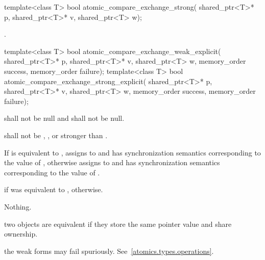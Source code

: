 %
%
\begin{itemdecl}
template<class T>
  bool atomic_compare_exchange_strong(
    shared_ptr<T>* p, shared_ptr<T>* v, shared_ptr<T> w);
\end{itemdecl}

\begin{itemdescr}
\pnum
\returns {}
.
\end{itemdescr}

%
%
%
%
\begin{itemdecl}
template<class T>
  bool atomic_compare_exchange_weak_explicit(
    shared_ptr<T>* p, shared_ptr<T>* v, shared_ptr<T> w,
    memory_order success, memory_order failure);
template<class T>
  bool atomic_compare_exchange_strong_explicit(
    shared_ptr<T>* p, shared_ptr<T>* v, shared_ptr<T> w,
    memory_order success, memory_order failure);
\end{itemdecl}

\begin{itemdescr}
\pnum
\requires {} shall not be null and  shall not be null.

\pnum
\requires {} shall not be ,
, or stronger than .

\pnum
\effects If  is equivalent to , assigns  to
 and has synchronization semantics corresponding to the value of
, otherwise assigns  to  and has
synchronization semantics corresponding to the value of .

\pnum
\returns {} if  was equivalent to ,  otherwise.

\pnum
\throws Nothing.

\pnum
\remarks two  objects are equivalent if they store the same
pointer value and share ownership.

\pnum
\remarks the weak forms may fail spuriously. See~\ref{atomics.types.operations}.
\end{itemdescr}

